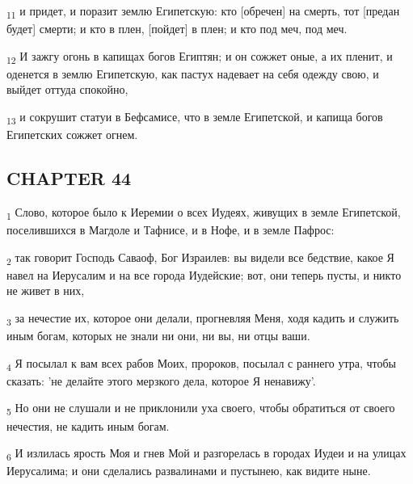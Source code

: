 \begin{tcolorbox}
\textsubscript{11} и придет, и поразит землю Египетскую: кто [обречен] на смерть, тот [предан будет] смерти; и кто в плен, [пойдет] в плен; и кто под меч, под меч.
\end{tcolorbox}
\begin{tcolorbox}
\textsubscript{12} И зажгу огонь в капищах богов Египтян; и он сожжет оные, а их пленит, и оденется в землю Египетскую, как пастух надевает на себя одежду свою, и выйдет оттуда спокойно,
\end{tcolorbox}
\begin{tcolorbox}
\textsubscript{13} и сокрушит статуи в Бефсамисе, что в земле Египетской, и капища богов Египетских сожжет огнем.
\end{tcolorbox}
\subsection{CHAPTER 44}
\begin{tcolorbox}
\textsubscript{1} Слово, которое было к Иеремии о всех Иудеях, живущих в земле Египетской, поселившихся в Магдоле и Тафнисе, и в Нофе, и в земле Пафрос:
\end{tcolorbox}
\begin{tcolorbox}
\textsubscript{2} так говорит Господь Саваоф, Бог Израилев: вы видели все бедствие, какое Я навел на Иерусалим и на все города Иудейские; вот, они теперь пусты, и никто не живет в них,
\end{tcolorbox}
\begin{tcolorbox}
\textsubscript{3} за нечестие их, которое они делали, прогневляя Меня, ходя кадить и служить иным богам, которых не знали ни они, ни вы, ни отцы ваши.
\end{tcolorbox}
\begin{tcolorbox}
\textsubscript{4} Я посылал к вам всех рабов Моих, пророков, посылал с раннего утра, чтобы сказать: 'не делайте этого мерзкого дела, которое Я ненавижу'.
\end{tcolorbox}
\begin{tcolorbox}
\textsubscript{5} Но они не слушали и не приклонили уха своего, чтобы обратиться от своего нечестия, не кадить иным богам.
\end{tcolorbox}
\begin{tcolorbox}
\textsubscript{6} И излилась ярость Моя и гнев Мой и разгорелась в городах Иудеи и на улицах Иерусалима; и они сделались развалинами и пустынею, как видите ныне.
\end{tcolorbox}
